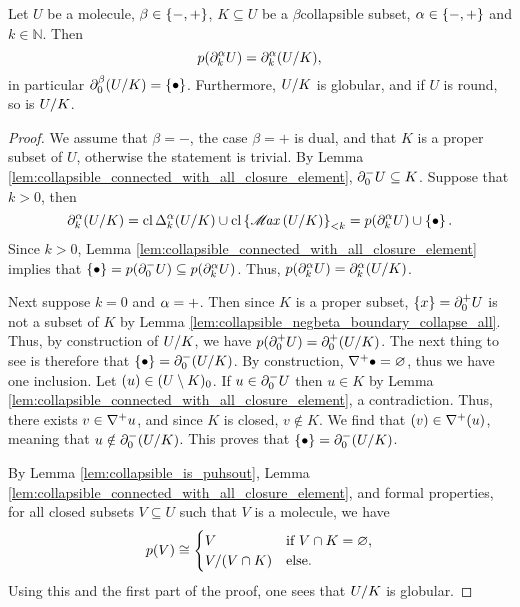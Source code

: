 \begin{lem} \label{lem:collapsible_mapcoll_preserve_boundaries}
    Let \( U \) be a molecule, \( \beta \in \set{-, +} \), \( K \subseteq U \) be a \( \beta \)\nbd collapsible subset, \( \a \in \set{-, +} \) and \( k \in \mathbb{N} \).
    Then 
    \begin{equation*}
        \mapcoll (\bd{k}{\a} U) = \bd{k}{\a} (\coll{K}{U}),
    \end{equation*}
    in particular \( \bd{0}{\beta} (\coll{K}{U}) = \set{\zcoll} \).
    Furthermore, \( \coll{K}{U} \) is globular, and if \( U \) is round, so is \( \coll{K}{U} \).
\end{lem}
\begin{proof}
    We assume that \( \beta = - \), the case \( \beta = + \) is dual, and that \( K \) is a proper subset of \( U \), otherwise the statement is trivial.
    By Lemma \ref{lem:collapsible_connected_with_all_closure_element}, \( \bd{0}{-} U \subseteq K \).
    Suppose that \( k > 0 \), then
    \begin{equation*}
        \bd{k}{\a} (\coll{K}{U}) = \clos \faces{k}{\a} (\coll{K}{U}) \cup \gr{< k}{\clset{\maxel (\coll{K}{U})}} = \mapcoll(\bd{k}{\a} U) \cup \set{\zcoll}.
    \end{equation*}
    Since \( k > 0 \), Lemma \ref{lem:collapsible_connected_with_all_closure_element} implies that \( \set{\zcoll} = p(\bd{0}{-} U) \subseteq p(\bd{k}{\a} U) \).
    Thus, \(  \mapcoll (\bd{k}{\a} U) = \bd{k}{\a} (\coll{K}{U}) \).

    Next suppose \( k = 0 \) and \( \a = + \).
    Then since \( K \) is a proper subset, \( \set{x} = \bd{0}{+} U \) is not a subset of \( K \) by Lemma \ref{lem:collapsible_negbeta_boundary_collapse_all}. 
    Thus, by construction of \( \coll{K}{U} \), we have \( \mapcoll (\bd{0}{+} U) = \bd{0}{+} (\coll{K}{U}) \).
    The next thing to see is therefore that \( \set{\zcoll} = \bd{0}{-} (\coll{K}{U}) \).
    By construction, \( \cofaces{}{+} \zcoll = \varnothing \), thus we have one inclusion.
    Let \( \icoll{u} \in \gr{0}{(U \setminus K)} \).
    If \( u \in \bd{0}{-} U \) then \( u \in K \) by Lemma \ref{lem:collapsible_connected_with_all_closure_element}, a contradiction.
    Thus, there exists \( v \in \cofaces{}{+} u \), and since \( K \) is closed, \( v \notin K \).
    We find that \( \icoll{v} \in \cofaces{}{+} \icoll{u} \), meaning that \( u \notin \bd{0}{-} (\coll{K}{U}) \).
    This proves that \( \set{\zcoll} = \bd{0}{-} (\coll{K}{U}) \).

    By Lemma \ref{lem:collapsible_is_puhsout}, Lemma \ref{lem:collapsible_connected_with_all_closure_element}, and formal properties, for all closed subsets \( V \subseteq U \) such that \( V \) is a molecule, we have 
    \begin{equation*}
        p(V) \cong
        \begin{cases}
            V & \text{if } V \cap K = \varnothing, \\
            \coll{(V \cap K)}{V} & \text{else}.
        \end{cases}
    \end{equation*}
    Using this and the first part of the proof, one sees that \( \coll{K}{U} \) is globular.


\end{proof}
